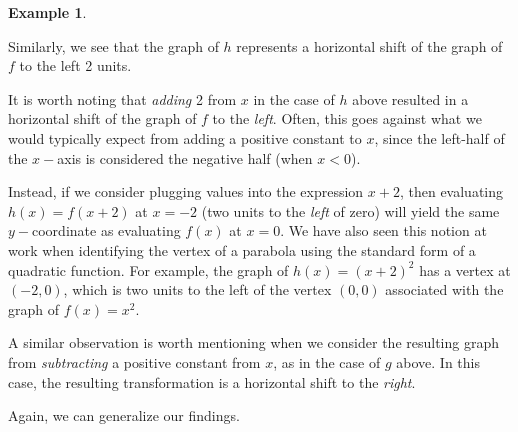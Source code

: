 \documentclass[12pt]{book}
\theoremstyle{definition}
\newtheorem{example}{Example}
\begin{document}
\begin{example}
\begin{multicols}{2}
\begin{center}
\end{center}
\end{multicols}
Similarly, we see that the graph of $h$ represents a horizontal shift of the graph of $f$ to the left 2 units.
\end{example}
It is worth noting that {\it adding} 2 from $x$ in the case of $h$ above resulted in a horizontal shift of the graph of $f$ to the {\it left}.  Often, this goes against what we would typically expect from adding a positive constant to $x$, since the left-half of the $x-$axis is considered the negative half (when $x<0$).\par
Instead, if we consider plugging values into the expression $x+2$, then evaluating $h(x)=f(x+2)$ at $x=-2$ (two units to the {\it left} of zero) will yield the same $y-$coordinate as evaluating $f(x)$ at $x=0$.  We have also seen this notion at work when identifying the vertex of a parabola using the standard form of a quadratic function.  For example, the graph of $h(x)=(x+2)^2$ has a vertex at $(-2,0)$, which is two units to the left of the vertex $(0,0)$ associated with the graph of $f(x)=x^2$.\par
A similar observation is worth mentioning when we consider the resulting graph from {\it subtracting} a positive constant from $x$, as in the case of $g$ above.  In this case, the resulting transformation is a horizontal shift to the {\it right}.\par
Again, we can generalize our findings.
\begin{center}
\end{center}
\end{document}
